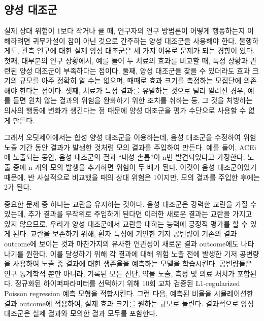 \documentclass[10.5pt]{book}
\theoremstyle{definition}
\theoremstyle{definition}
\theoremstyle{definition}
\theoremstyle{remark}
\begin{document}
\subsection{양성 대조군}\label{PositiveControls}


실제 상대 위험이 1보다 작거나 클 때, 연구자의 연구 방법론이 어떻게
행동하는지 이해하려면 귀무가설이 참이 아닌 것으로 간주하는 양성 대조군을
사용해야 한다. 불행하게도, 관측 연구에 대한 실제 양성 대조군은 세 가지
이유로 문제가 되는 경향이 있다. 첫째, 대부분의 연구 상황에서, 예를 들어
두 치료의 효과를 비교할 때, 특정 상황과 관련된 양성 대조군이 부족하다는
점이다. 둘째, 양성 대조군을 찾을 수 있더라도 효과 크기의 규모를 아주
정확히 알 수는 없으며, 때때로 효과 크기를 측정하는 모집단에 의존해야
한다는 점이다. 셋째, 치료가 특정 결과를 유발하는 것으로 널리 알려진
경우, 예를 들면 원치 않는 결과의 위험을 완화하기 위한 조치를 취하는 등,
그 것을 처방하는 의사의 행동에 변화가 생긴다는 점 때문에 양성 대조군을
평가 수단으로 사용할 수 없게 만든다. \citep{noren_2014}


그래서 오딧세이에서는 합성 양성 대조군을 이용하는데,
\citep{schuemie_2018} 음성 대조군을 수정하여 위험 노출 기간 동안 결과가
발생한 것처럼 모의 결과를 주입하여 만든다. 예를 들어, ACEi에 노출되는
동안, 음성 대조군의 결과 ``내성 손톱''이 n번 발견되었다고 가정한다. 노출
중에 n 개의 모의 발생을 추가하면 위험이 두 배가 된다. 이것이 음성
대조군이었기 때문에, 반 사실적으로 비교했을 때의 상대 위험은 1이지만,
모의 결과를 주입한 후에는 2가 된다.

중요한 문제 중 하나는 교란을 유지하는 것이다. 음성 대조군은 강력한
교란을 가질 수 있는데, 추가 결과를 무작위로 주입하게 된다면 이러한
새로운 결과는 교란을 가지고 있지 않으므로, 우리가 양성 대조군에서 교란을
대하는 능력에 긍정적 평가를 할 수 있게 된다. 교란을 보존하기 위해, 환자
특성에 기인한 기저 공변량이 기존의 결과 outcome에 보이는 것과 마찬가지의
유사한 연관성이 새로운 결과 outcome에도 나타나기를 원한다. 이를 달성하기
위해 각 결과에 대해 위험 노출 전에 발생한 기저 공변량을 사용하여 노출 중
결과에 대한 생존율을 예측하는 모델을 학습시킨다. 공변량들은 인구
통계학적 뿐만 아니라, 기록된 모든 진단, 약물 노출, 측정 및 의료 처치가
포함된다. 정규화된 하이퍼파라미터를 선택하기 위해 10회 교차 검증된
L1-regularized Poisson regression \citep{suchard_2013} 예측 모형을
적합시킨다. 그런 다음, 예측된 비율을 시뮬레이션한 결과 outcome에
적용하여, 실제 효과 크기를 원하는 규모로 늘린다. 결과적으로 양성
대조군은 실제 결과와 모의한 결과 모두를 포함한다.
\end{document}
